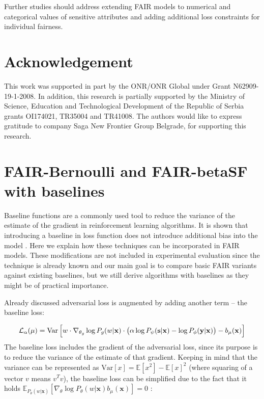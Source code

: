 \documentclass[preprint,12pt]{elsarticle}
\begin{document}
Further studies should address extending FAIR models to numerical and categorical values of sensitive attributes and adding additional loss constraints for individual fairness.

\section*{Acknowledgement}
This work was supported in part by the ONR/ONR Global under Grant N62909-19-1-2008. In addition, this research is partially supported by the Ministry of Science, Education and Technological Development of the Republic of Serbia grants OI174021, TR35004 and TR41008. The authors would like to express gratitude to company Saga New Frontier Group Belgrade, for supporting this research.




\appendix

\section{FAIR-Bernoulli and FAIR-betaSF with baselines}
\label{app:baselines}

Baseline functions are a commonly used tool to reduce the variance of the estimate of the gradient in reinforcement learning algorithms. It is shown that introducing a baseline in loss function does not introduce additional bias into the model \cite{sutton2018reinforcement}. Here we explain how these techniques can be incorporated in FAIR models. These modifications are not included in experimental evaluation since the technique is already known and our main goal is to compare basic FAIR variants against existing baselines, but we still derive algorithms with baselines as they might be of practical importance.

Already discussed adversarial loss is augmented by adding another term -- the baseline loss:

\begin{equation}
{\cal L}_{\alpha}(\mu) = \mathrm{Var} \left[w\cdot \nabla_{\theta_g}\log P_g(w|\mathbf{x}) \cdot\left( \alpha \log P_\psi(\mathbf{s}|\mathbf{x}) - \log P_\phi(\mathbf{y}|\mathbf{x}) \right)
     - b_\mu(\mathbf{x}) \right]
\end{equation}
The baseline loss includes the gradient of the adversarial loss, since its purpose is to reduce the variance of the estimate of that gradient.
Keeping in mind that the variance can be represented as $\mathrm{Var}[x] = \mathbb{E}[x^2] - \mathbb{E}[x]^2$ (where squaring of a vector $v$ means $v^Tv$), the baseline loss can be simplified due to the fact that it holds
$\mathbb{E}_{P_\theta(w|\mathbf{x})}[\nabla_{\theta}\log P_\theta(w|\mathbf{x}) b_\mu(\mathbf{x})]=0$ \cite{sutton2018reinforcement}:
\end{document}
